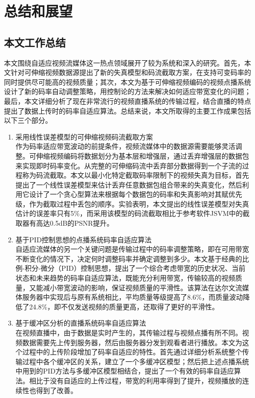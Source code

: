 \chapter{总结和展望}

\section{本文工作总结}

本文围绕自适应视频流媒体这一热点领域展开了较为系统和深入的研究。首先，本文针对可伸缩视频数据源提出了新的失真模型和码流截取方案，在支持可变码率的同时提供尽可能高的视频质量；其次，本文为基于可伸缩视频编码的视频点播系统设计了新的码率自动调整策略，用控制论的方法来解决如何适应带宽变化的问题；最后，本文详细分析了现在非常流行的视频直播系统的传输过程，结合直播的特点提出了数据上传时的码率自适应算法。总结来说，本文所取得的主要工作成果包括以下三个部分。
\begin{enumerate}
\item {采用线性误差模型的可伸缩视频码流截取方案} \\
作为码率适应带宽波动的前提条件，视频流媒体中的数据源需要能够灵活调整。可伸缩视频编码将数据划分为基本层和增强层，通过丢弃增强层的数据包来实现即时码率变化。从完整的可伸缩码流中丢弃部分数据得到一个子流的过程称为码流截取。本文以最小化特定截取码率限制下的视频失真为目标，首先提出了一个线性误差模型来估计丢弃任意数据包组合带来的失真变化，然后利用它设计了一个贪心型算法来根据每个数据包的码率和失真影响对其赋优先级，作为截取过程中丢包的顺序。实验表明，本文提出的线性误差模型对失真估计的误差率只有5\%，而采用该模型的码流截取相比于参考软件JSVM中的截取器有高达0.5dB的PSNR提升。
\item {基于PID控制思想的点播系统码率自适应算法} \\
自适应流媒体的另一个关键问题是传输过程中的码率调整策略，即在可用带宽不断变化的情况下，决定何时调整码率并确定调整到多少。本文基于经典的比例-积分-微分（PID）控制思想，提出了一个综合考虑带宽的历史状况、当前状态和未来趋势的码率自适应算法，既能充分利用带宽，传输较高的视频质量，又能减小带宽波动的影响，保证视频质量的平滑性。该算法在达尔文流媒体服务器中实现后与原有系统相比，平均质量等级提高了8.6\%，而质量波动降低了24.8\%，即不仅发送视频的质量更高，还取得了更好的平滑性。
\item {基于缓冲区分析的直播系统码率自适应算法} \\
在视频直播中，由于数据是实时产生的，其传输过程与视频点播有所不同。视频数据需要先上传到服务器，然后由服务器分发到观看者进行播放。本文为这个过程中的上传阶段增加了码率自适应的特性。首先通过详细分析系统整个传输过程中各个缓冲区的关系，建立了一个多缓冲区模型；然后把上述点播系统中用到的PID方法与多缓冲区模型相结合，提出了一个有效的码率自适应算法。相比于没有自适应的上传过程，带宽的利用率得到了提升，视频播放的连续性也得到了改善。
\end{enumerate}

